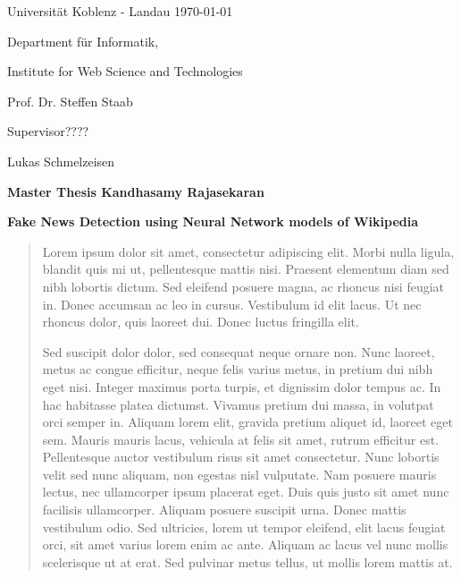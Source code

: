 \documentclass[a4paper, 11pt]{article}
\newcommand{\myName}{Kandhasamy Rajasekaran}
\newcommand{\Title}{Fake News Detection using Neural Network models of Wikipedia}
\newcommand{\subject}{Institute for Web Science and Technologies}
\newcommand{\expert}{Prof. Dr. Steffen Staab}%
\newcommand{\supervisor}{Supervisor????} %
\newcommand{\scndSupervisor}{Lukas Schmelzeisen} %
\newcommand{\type}{Master Thesis}
\begin{document}
Universit\"{a}t Koblenz - Landau \hfill \today

Department f\"{u}r Informatik,

\subject{}

\expert{}

\supervisor{}

\scndSupervisor{}

\begin{center}
	\large{\bf \type{}  \myName{}}

	\vspace*{0.5cm}

	\large{\bf \Title}
\end{center}

\setlength{\parskip}{1.5ex plus0.5ex minus 0.5ex}
\begin{abstract}
\frenchspacing
\noindent
Lorem ipsum dolor sit amet, consectetur adipiscing elit. Morbi nulla ligula, blandit quis mi ut, pellentesque mattis nisi. Praesent elementum diam sed nibh lobortis dictum. Sed eleifend posuere magna, ac rhoncus nisi feugiat in. Donec accumsan ac leo in cursus. Vestibulum id elit lacus. Ut nec rhoncus dolor, quis laoreet dui. Donec luctus fringilla elit.

Sed suscipit dolor dolor, sed consequat neque ornare non. Nunc laoreet, metus ac congue efficitur, neque felis varius metus, in pretium dui nibh eget nisi. Integer maximus porta turpis, et dignissim dolor tempus ac. In hac habitasse platea dictumst. Vivamus pretium dui massa, in volutpat orci semper in. Aliquam lorem elit, gravida pretium aliquet id, laoreet eget sem. Mauris mauris lacus, vehicula at felis sit amet, rutrum efficitur est. Pellentesque auctor vestibulum risus sit amet consectetur. Nunc lobortis velit sed nunc aliquam, non egestas nisl vulputate. Nam posuere mauris lectus, nec ullamcorper ipsum placerat eget. Duis quis justo sit amet nunc facilisis ullamcorper. Aliquam posuere suscipit urna. Donec mattis vestibulum odio. Sed ultricies, lorem ut tempor eleifend, elit lacus feugiat orci, sit amet varius lorem enim ac ante. Aliquam ac lacus vel nunc mollis scelerisque ut at erat. Sed pulvinar metus tellus, ut mollis lorem mattis at.
\end{abstract}
\end{document}
